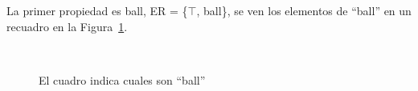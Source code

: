 La primer propiedad es \textsf{ball}, ER = \{$\top$, \textsf{ball}\}, se ven los elementos de ``ball'' en un recuadro en la Figura~\ref{fig-modelo3}.

\begin{figure}[ht]
\begin{center}
\\[0pt]
\caption{El cuadro indica cuales son ``ball''}
\label{fig-modelo3}
\end{center}
\end{figure}

